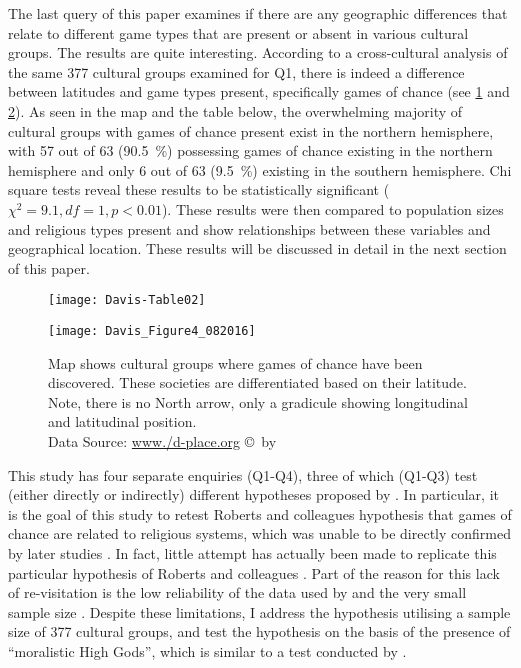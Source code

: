 The last query of this paper examines if there are any geographic differences that relate to different game types that are present or absent in various cultural groups. The results are quite interesting. According to a cross-cultural analysis of the same 377 cultural groups examined for Q1, there is indeed a difference between latitudes and game types present, specifically games of chance (see \cref{fig:Davis-Table03} and \cref{fig:Figure4_Davis_082016}). As seen in the map and the table below, the overwhelming majority of cultural groups with games of chance present exist in the northern hemisphere, with 57 out of 63 (\SI{90.5}{\percent}) possessing games of chance existing in the northern hemisphere and only 6 out of 63 (\SI{9.5}{\percent}) existing in the southern hemisphere. Chi square tests reveal these results to be statistically significant ($\chi^{2} = 9.1, df = 1, p < 0.01$). These results were then compared to population sizes and religious types present and show relationships between these variables and geographical location. These results will be discussed in detail in the next section of this paper.

\begin{figure}[!htb] %
	\texttt{[image: Davis-Table02]}
	\label{fig:Davis-Table03}
\end{figure}

\begin{figure}[!htb] %
	\texttt{[image: Davis\_Figure4\_082016]}
	\caption{Map shows cultural groups where games of chance have been discovered. These societies are differentiated based on their latitude. Note, there is no North arrow, only a gradicule showing longitudinal and latitudinal position.
	{\normalfont\scriptsize \\ Data Source: \href{http:/www./d-place.org}{www./d-place.org} \copyright\ by 
                 \shortauthor
                  }}
	\label{fig:Figure4_Davis_082016}
\end{figure}
This study has four separate enquiries (Q1-Q4), three of which (Q1-Q3) test (either directly or indirectly) different hypotheses proposed by \textcite{roberts1959}. In particular, it is the goal of this study to retest Roberts and colleagues hypothesis that games of chance are related to religious systems, which was unable to be directly confirmed by later studies \parencites[e.g.][]{ball1972}{chick1998}. In fact, little attempt has actually been made to replicate this particular hypothesis of Roberts and colleagues \parencite[18]{binde2005}. Part of the reason for this lack of re-visitation is the low reliability of the data used by \textcite{roberts1959} and the very small sample size \parencite[18]{binde2005}. Despite these limitations, I address the hypothesis utilising a sample size of 377 cultural groups, and test the hypothesis on the basis of the presence of ``moralistic High Gods”, which is similar to a test conducted by \textcite{ball1972}. 


